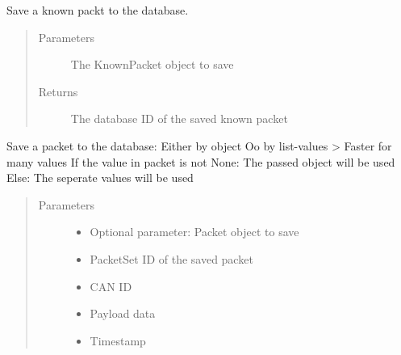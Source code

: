 \documentclass[letterpaper,10pt,english]{sphinxmanual}
\begin{document}
\begin{fulllineitems}
\begin{fulllineitems}
\label{\detokenize{src:src.Database.Database.saveKnownPacket}}
Save a known packt to the database.
\begin{quote}\begin{description}
\item[{Parameters}] \leavevmode
{} \textendash{} The KnownPacket object to save

\item[{Returns}] \leavevmode
The database ID of the saved known packet

\end{description}\end{quote}

\end{fulllineitems}


\begin{fulllineitems}
\label{\detokenize{src:src.Database.Database.savePacket}}
Save a packet to the database: Either by object Oo by list-values \textendash{}\textgreater{} Faster for many values
If the value in packet is not None: The passed object will be used
Else: The seperate values will be used
\begin{quote}\begin{description}
\item[{Parameters}] \leavevmode\begin{itemize}
\item {} 
 \textendash{} Optional parameter: Packet object to save

\item {} 
 \textendash{} PacketSet ID of the saved packet

\item {} 
 \textendash{} CAN ID

\item {} 
 \textendash{} Payload data

\item {} 
 \textendash{} Timestamp


\end{itemize}
\end{description}
\end{quote}
\end{fulllineitems}
\end{fulllineitems}
\end{document}
